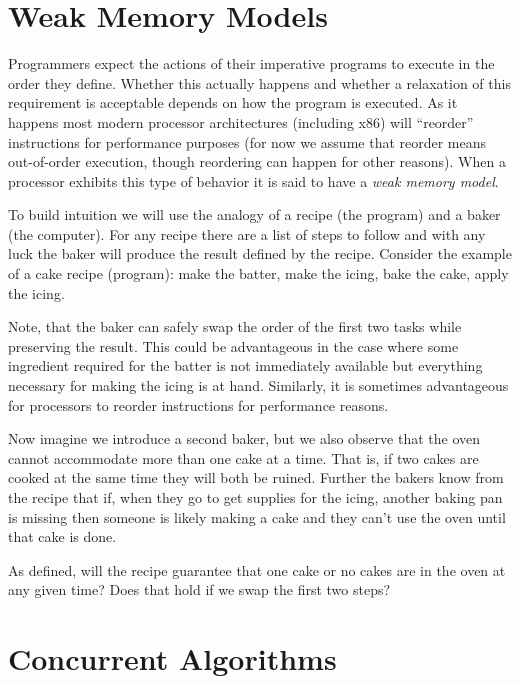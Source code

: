 \documentclass[9pt,twocolumn]{extarticle}
\begin{document}
\section{Weak Memory Models}
\vspace{-0.25cm}
Programmers expect the actions of their imperative programs to execute in the order they define. Whether this actually happens and whether a relaxation of this requirement is acceptable depends on how the program is executed. As it happens most modern processor architectures (including x86) will ``reorder'' instructions for performance purposes (for now we assume that reorder means out-of-order execution, though reordering can happen for other reasons). When a processor exhibits this type of behavior it is said to have a \textit{weak memory model}.

To build intuition we will use the analogy of a recipe (the program) and a baker (the computer). For any recipe there are a list of steps to follow and with any luck the baker will produce the result defined by the recipe. Consider the example of a cake recipe (program): make the batter, make the icing, bake the cake, apply the icing.

Note, that the baker can safely swap the order of the first two tasks while preserving the result. This could be advantageous in the case where some ingredient required for the batter is not immediately available but everything necessary for making the icing is at hand. Similarly, it is sometimes advantageous for processors to reorder instructions for performance reasons.

Now imagine we introduce a second baker, but we also observe that the oven cannot accommodate more than one cake at a time. That is, if two cakes are cooked at the same time they will both be ruined. Further the bakers know from the recipe that if, when they go to get supplies for the icing, another baking pan is missing then someone is likely making a cake and they can't use the oven until that cake is done.

As defined, will the recipe guarantee that one cake or no cakes are in the oven at any given time? Does that hold if we swap the first two steps?

\vspace{-0.25cm}
\section{Concurrent Algorithms}
\vspace{-0.25cm}
\end{document}
